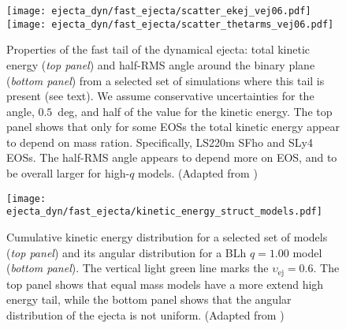 \begin{figure}%
    \centering 
    \texttt{[image: ejecta\_dyn/fast\_ejecta/scatter\_ekej\_vej06.pdf]}
    \texttt{[image: ejecta\_dyn/fast\_ejecta/scatter\_thetarms\_vej06.pdf]}
    \caption{
        Properties of the fast tail of the dynamical ejecta:
        total kinetic energy (\textit{top panel}) and 
        half-\ac{RMS} angle around the binary plane (\textit{bottom panel})
        from a selected set of simulations where this tail is present (see text).
        We assume conservative uncertainties for the angle, $0.5$~deg, 
        and half of the value for the kinetic energy. 
        The top panel shows that only for some \acp{EOS} the 
        total kinetic energy appear to depend on mass ration. Specifically, LS220m SFho and SLy4 \acp{EOS}.
        The half-\ac{RMS} angle appears to depend more on \ac{EOS}, and to be overall larger for high-$q$ models.
        (Adapted from \citet{Nedora:2021eoj})
    } 
    \label{fig:ejecta_v06}
\end{figure}

\begin{figure}%
    \centering 
    \texttt{[image: ejecta\_dyn/fast\_ejecta/kinetic\_energy\_struct\_models.pdf]}
    \caption{
        Cumulative kinetic energy distribution for a selected set of models (\textit{top panel}) 
        and its angular distribution for a BLh $q=1.00$ model (\textit{bottom panel}).
        The vertical light green line marks the $\upsilon_{\text{ej}}=0.6$.
        The top panel shows that equal mass models have a more extend high energy tail,
        while the bottom panel shows that the angular distribution of the ejecta is not 
        uniform.
        (Adapted from \citet{Nedora:2021eoj})
    } 
    \label{fig:ejecta_vel_hist}
\end{figure}

